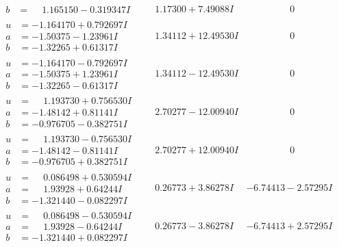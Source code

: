 \documentclass[1p]{elsarticle_modified}
\theoremstyle{definition}
\begin{document}
$$\begin{array}{c|c|c}
\begin{aligned}
b &= \phantom{-}1.165150 - 0.319347 I\end{aligned}
 & \phantom{-}1.17300 + 7.49088 I & \phantom{-0.000000 } 0 \\ \hline\begin{aligned}
u &= -1.164170 + 0.792697 I \\
a &= -1.50375 - 1.23961 I \\
b &= -1.32265 + 0.61317 I\end{aligned}
 & \phantom{-}1.34112 + 12.49530 I & \phantom{-0.000000 } 0 \\ \hline\begin{aligned}
u &= -1.164170 - 0.792697 I \\
a &= -1.50375 + 1.23961 I \\
b &= -1.32265 - 0.61317 I\end{aligned}
 & \phantom{-}1.34112 - 12.49530 I & \phantom{-0.000000 } 0 \\ \hline\begin{aligned}
u &= \phantom{-}1.193730 + 0.756530 I \\
a &= -1.48142 + 0.81141 I \\
b &= -0.976705 - 0.382751 I\end{aligned}
 & \phantom{-}2.70277 - 12.00940 I & \phantom{-0.000000 } 0 \\ \hline\begin{aligned}
u &= \phantom{-}1.193730 - 0.756530 I \\
a &= -1.48142 - 0.81141 I \\
b &= -0.976705 + 0.382751 I\end{aligned}
 & \phantom{-}2.70277 + 12.00940 I & \phantom{-0.000000 } 0 \\ \hline\begin{aligned}
u &= \phantom{-}0.086498 + 0.530594 I \\
a &= \phantom{-}1.93928 + 0.64244 I \\
b &= -1.321440 - 0.082297 I\end{aligned}
 & \phantom{-}0.26773 + 3.86278 I & -6.74413 - 2.57295 I \\ \hline\begin{aligned}
u &= \phantom{-}0.086498 - 0.530594 I \\
a &= \phantom{-}1.93928 - 0.64244 I \\
b &= -1.321440 + 0.082297 I\end{aligned}
 & \phantom{-}0.26773 - 3.86278 I & -6.74413 + 2.57295 I \\ \hline\begin{aligned}

\end{aligned}
\end{array}$$
\end{document}
